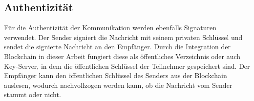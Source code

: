 \subsection{Authentizität}

Für die Authentizität der Kommunikation werden ebenfalls Signaturen verwendet. Der Sender signiert die Nachricht mit seinem privaten Schlüssel und sendet die signierte Nachricht an den Empfänger. Durch die Integration der Blockchain in dieser Arbeit fungiert diese als öffentliches Verzeichnis oder auch Key-Server, in dem die öffentlichen Schlüssel der Teilnehmer gespeichert sind. Der Empfänger kann den öffentlichen Schlüssel des Senders aus der Blockchain auslesen, wodurch nachvollzogen werden kann, ob die Nachricht vom Sender stammt oder nicht.